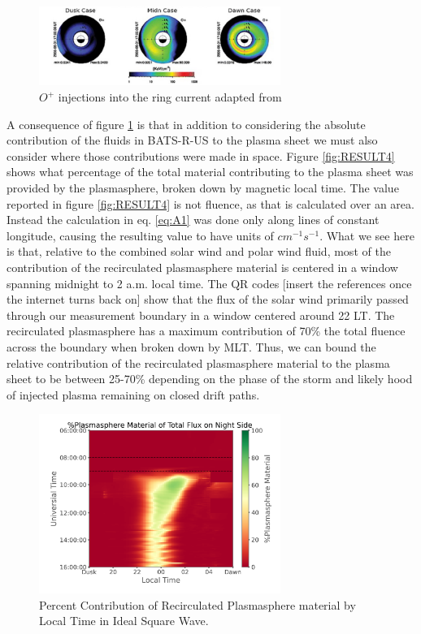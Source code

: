 \documentclass[utf8]{frontiersinFPHY_FAMS}
\begin{document}
\begin{figure}
    \centering
    \includegraphics[width=0.7\textwidth]{Welling2011_O_injection.png}
    \caption{$O^{+}$ injections into the ring current adapted from \citet[Welling et al.(2011)]{Welling2011}}
    \label{fig:REFERENCE1}
\end{figure}

A consequence of figure \ref{fig:REFERENCE1} is that in addition to considering the absolute contribution of the fluids in BATS-R-US to the plasma sheet we must also consider where those contributions were made in space. Figure \ref{fig:RESULT4} shows what percentage of the total material contributing to the plasma sheet was provided by the plasmasphere, broken down by magnetic local time. The value reported in figure \ref{fig:RESULT4} is not fluence, as that is calculated over an area. Instead the calculation in eq. \ref{eq:A1} was done only along lines of constant longitude, causing the resulting value to have units of $cm ^{-1} s^{-1}$. What we see here is that, relative to the combined solar wind and polar wind fluid, most of the contribution of the recirculated plasmasphere material is centered in a window spanning midnight to 2 a.m. local time. The QR codes [insert the references once the internet turns back on] show that the flux of the solar wind primarily passed through our measurement boundary in a window centered around 22 LT. The recirculated plasmasphere has a maximum contribution of 70\% the total fluence across the boundary when broken down by MLT. Thus, we can bound the relative contribution of the recirculated plasmasphere material to the plasma sheet to be between 25-70\% depending on the phase of the storm and likely hood of injected plasma remaining on closed drift paths. 

\begin{figure}[!ht]
\begin{center}
    \includegraphics[width=0.7\textwidth]{PCPLonCoLat.png}
    \caption{Percent Contribution of Recirculated Plasmasphere material by Local Time in Ideal Square Wave.}
    \label{fig:RESULT3}
\end{center}
\end{figure}
\end{document}
